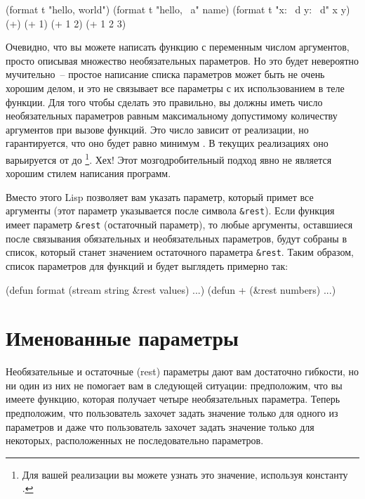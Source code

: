 \begin{myverb}
  (format t "hello, world")
  (format t "hello, ~a" name)
  (format t "x: ~d y: ~d" x y)
  (+)
  (+ 1)
  (+ 1 2)
  (+ 1 2 3)
\end{myverb}

Очевидно, что вы можете написать функцию с переменным числом аргументов, просто описывая
множество необязательных параметров.  Но это будет невероятно мучительно~-- простое
написание списка параметров может быть не очень хорошим делом, и это не связывает все
параметры с их использованием в теле функции.  Для того чтобы сделать это правильно, вы
должны иметь число необязательных параметров равным максимальному допустимому количеству
аргументов при вызове функций.  Это число зависит от реализации, но гарантируется, что оно
будет равно минимум .  В текущих реализациях оно варьируется от  до
\footnote{Для вашей реализации вы можете узнать это значение, используя
  константу .}.  Хех!  Этот мозгодробительный подход явно не
является хорошим стилем написания программ.

Вместо этого Lisp позволяет вам указать параметр, который примет все аргументы (этот
параметр указывается после символа \lstinline!&rest!).  Если функция имеет параметр
\lstinline!&rest! (остаточный параметр), то любые аргументы, оставшиеся после связывания
обязательных и необязательных параметров, будут собраны в список, который станет значением
остаточного параметра \lstinline!&rest!.  Таким образом, список параметров для функций
 и \code{+} будет выглядеть примерно так:

\begin{myverb}
  (defun format (stream string &rest values) ...)
  (defun + (&rest numbers) ...) 
\end{myverb}

\section{Именованные параметры}

Необязательные и остаточные (rest) параметры дают вам достаточно гибкости, но ни один из
них не помогает вам в следующей ситуации: предположим, что вы имеете функцию, которая
получает четыре необязательных параметра.  Теперь предположим, что пользователь захочет
задать значение только для одного из параметров и даже что пользователь захочет задать
значение только для некоторых, расположенных не последовательно параметров.

